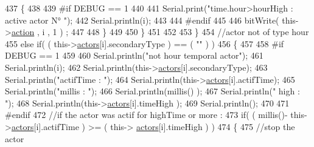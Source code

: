 \begin{DoxyCode}
437                             \{
438                                 
439 \textcolor{preprocessor}{                            #if DEBUG == 1 }
440                         
441                                 Serial.print(\textcolor{stringliteral}{"time.hour>hourHigh : active actor N° "});
442                                 Serial.println(i);
443                 
444 \textcolor{preprocessor}{                            #endif      }
445 
446                                 bitWrite( this->\hyperlink{class_jetpack_aca3142925a7b0834b34ae91d26af7765}{action} , i , 1 ) ;
447                                                     
448                             \}
449 
450                         \}
451 
452 
453                     \}
454                     \textcolor{comment}{//actor not of type hour}
455                     \textcolor{keywordflow}{else} \textcolor{keywordflow}{if}( ( this->\hyperlink{class_jetpack_a7e16d2f97837f9712a2e6de1c50d99db}{actors}[i].secondaryType ) == ( \textcolor{stringliteral}{""} ) )     
456                     \{
457                     
458 \textcolor{preprocessor}{                    #if DEBUG == 1 }
459                         
460                         Serial.println(\textcolor{stringliteral}{"not hour temporal actor"});
461                         Serial.println(i);
462                         Serial.println(this->\hyperlink{class_jetpack_a7e16d2f97837f9712a2e6de1c50d99db}{actors}[i].secondaryType);
463                         Serial.println(\textcolor{stringliteral}{"actifTime : "});
464                         Serial.println(this->\hyperlink{class_jetpack_a7e16d2f97837f9712a2e6de1c50d99db}{actors}[i].actifTime);
465                         Serial.println(\textcolor{stringliteral}{"millis : "});
466                         Serial.println(millis() );
467                         Serial.println(\textcolor{stringliteral}{" high : "});
468                         Serial.println(this->\hyperlink{class_jetpack_a7e16d2f97837f9712a2e6de1c50d99db}{actors}[i].timeHigh );
469                         Serial.println();
470                     
471 \textcolor{preprocessor}{                    #endif}
472                         \textcolor{comment}{//if the actor was actif for highTime or more :}
473                         \textcolor{keywordflow}{if}( ( millis()- this->\hyperlink{class_jetpack_a7e16d2f97837f9712a2e6de1c50d99db}{actors}[i].actifTime  ) >= (  this->
      \hyperlink{class_jetpack_a7e16d2f97837f9712a2e6de1c50d99db}{actors}[i].timeHigh  ) )
474                         \{
475                             \textcolor{comment}{//stop the actor}

\end{DoxyCode}
